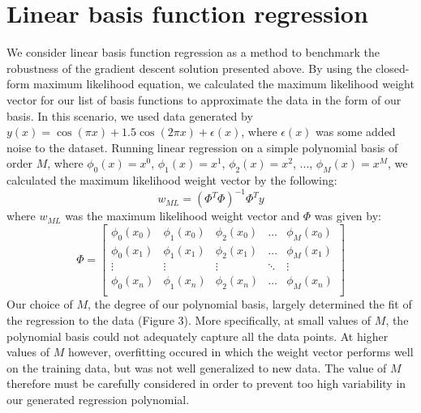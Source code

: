 \documentclass{article}
\begin{document}
\section{Linear basis function regression}
We consider linear basis function regression as a method to benchmark the robustness of the gradient descent solution presented above. By using the closed-form maximum likelihood equation, we calculated the maximum likelihood weight vector for our list of basis functions to approximate the data in the form of our basis. In this scenario, we used data generated by $y(x) = \cos(\pi x) + 1.5 \cos(2 \pi x) + \epsilon(x)$, where $\epsilon(x)$ was some added noise to the dataset. Running linear regression on a simple polynomial basis of order $M$, where $\phi_0(x) = x^0$, $\phi_1(x) = x^1$, $\phi_2(x) = x^2$, ..., $\phi_M(x) = x^M$, we calculated the maximum likelihood weight vector by the following:
$$w_{ML} = (\Phi^T \Phi)^{-1} \Phi^T y$$
where $w_{ML}$ was the maximum likelihood weight vector and $\Phi$ was given by:
$$\Phi =
\begin{bmatrix}
  \phi_0(x_0)   & \phi_1(x_0)   & \phi_2(x_0)   & \dots   & \phi_M(x_0) \\
  \phi_0(x_1)   & \phi_1(x_1)   & \phi_2(x_1)   & \dots   & \phi_M(x_1) \\
  \vdots        & \vdots        & \vdots        & \ddots  & \vdots \\
  \phi_0(x_n)   & \phi_1(x_n)   & \phi_2(x_n)   & \dots   & \phi_M(x_n) \\
\end{bmatrix}
$$
Our choice of $M$, the degree of our polynomial basis, largely determined the fit of the regression to the data (Figure 3). More specifically, at small values of $M$, the polynomial basis could not adequately capture all the data points. At higher values of $M$ however, overfitting occured in which the weight vector performs well on the training data, but was not well generalized to new data. The value of $M$ therefore must be carefully considered in order to prevent too high variability in our generated regression polynomial.
\end{document}
